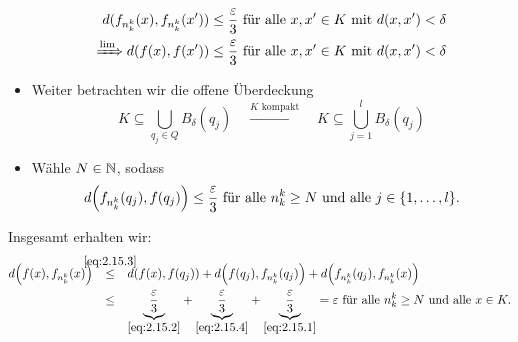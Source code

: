 \begin{beweis}
\begin{itemize}
		\begin{align}
			d(f_{n_k^k}(x),f_{n_k^k}(x')) &\leq \frac{\varepsilon}{3} \text{ für alle } x,x' \in K \text{ mit } d(x,x') < \delta \label{eq:2.15.1} \\
			\xRightarrow{\lim} d(f(x),f(x')) &\leq \frac{\varepsilon}{3} \text{ für alle } x,x' \in K \text{ mit } d(x,x') < \delta \label{eq:2.15.2}
		\end{align}
		\item Weiter betrachten wir die offene Überdeckung
		\begin{equation}
			K \subseteq \bigcup_{q_j \in Q} B_\delta (q_j) \quad \xrightarrow{K \text{ kompakt}} \quad K \subseteq \bigcup_{j=1}^l B_\delta (q_j) \label{eq:2.15.3}
		\end{equation}
		\item Wähle $N \in \mathbb{N}$, sodass
		\begin{equation}
			d\enbrace*{f_{n_k^k}(q_j),f(q_j)} \leq \frac{\varepsilon}{3} \text{ für alle } n_k^k \geq N \text{ und alle } j \in \{1, \dots, l\}. \label{eq:2.15.4}
		\end{equation}
	\end{itemize}
	Insgesamt erhalten wir:
	\begin{align*}
		d\enbrace*{f(x),f_{n_k^k}(x)} &\stack{\eqref{eq:2.15.3}}{\leq} d(f(x),f(q_j)) + d\enbrace*{f(q_j),f_{n_k^k}(q_j)} + d\enbrace*{f_{n_k^k}(q_j),f_{n_k^k}(x)} \\
		&\stack{}{\leq} \Underbrace{\frac{\varepsilon}{3}}{\eqref{eq:2.15.2}} + \Underbrace{\frac{\varepsilon}{3}}{\eqref{eq:2.15.4}} + \Underbrace{\frac{\varepsilon}{3}}{\eqref{eq:2.15.1}} = \varepsilon \text{ für alle } n_k^k \geq N \text{ und alle } x \in K.
	\end{align*}
\end{beweis}

